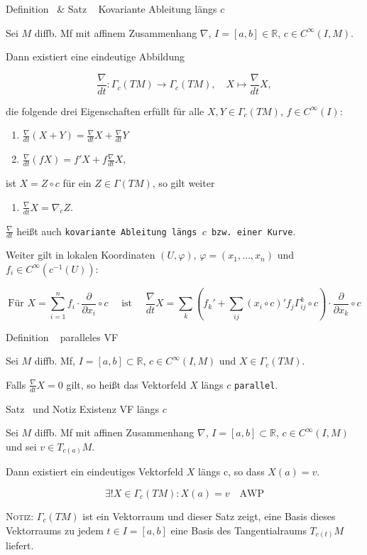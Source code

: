 \documentclass[a6paper,11pt,grid=front]{kartei}
\newcommand{\fl}[1]{\begin{flushleft}
 #1 \end{flushleft}}
\newcommand{\R}{\mathbb{R}}
\newcommand{\pd}[1][x_i]{\frac{\partial}{\partial {#1}}}
\newcommand{\nabladt}[1][t]{\frac{\nabla}{d#1}}
\newcounter{def}
\newcounter{satz}
\newcommand{\defreset}{\setcounter{def}{1}}
\newcommand{\satzreset}{\setcounter{satz}{1}}
\newcommand{\thisdef}{\thedef\ \stepcounter{def}}
\newcommand{\thissatz}{\thesatz\ \stepcounter{satz}}
\begin{document}
\nonameyet
{\scriptsize Definition \thisdef \& Satz \thissatz} 
{\scriptsize Kovariante Ableitung längs $c$}
{
	\scriptsize
	\vspace{-2em}
Sei $M$ diffb. Mf mit affinem Zusammenhang $\nabla$, $I =[a,b] \in \R$, 
$c\in C^\infty(I,M)$.
\fl{Dann existiert eine eindeutige Abbildung}
\[
\nabladt: \Gamma_c(TM) \to \Gamma_c(TM), \quad X \mapsto \nabladt X,
\]
\fl{die folgende drei Eigenschaften erfüllt für alle $X,Y \in \Gamma_c(TM)$,
$f\in C^\infty(I)$:}
\begin{enumerate}[1.]
\item $\nabladt(X+Y) = \nabladt X + \nabladt Y$
\item $\nabladt(fX) = f' X + f \nabladt X$,
\end{enumerate}
\fl{ist $X = Z \circ c$ für ein $Z \in \Gamma(TM)$, so gilt weiter}
\begin{enumerate}[3.]
\item $\nabladt X = \nabla_{\dot c} Z$.
\end{enumerate}
\fl{$\nabladt$ heißt auch \texttt{kovariante Ableitung längs $c$ bzw. einer
Kurve}.}
\fl{Weiter gilt in lokalen Koordinaten $(U,\varphi)$, 
\vspace{-1em}
$\varphi = (x_1,\dots,x_n)$ und $f_i \in C^\infty(c^{-1} (U))$:}
\[
\text{Für } X = \sum_{i=1}^n f_i \cdot \pd[x_i] \circ c 
\quad \text{ ist } \quad 
\nabladt X = \sum_k \left ( f_k' + \sum_{ij} (x_i \circ c)' f_j 
\Gamma^k_{ij} \circ c \right) \cdot \pd[x_k] \circ c
\]
}
{}
\defreset
\satzreset
{}

\nonameyet
{Definition \thisdef} {paralleles VF}
{
Sei $M$ diffb. Mf, $I = [a,b] \subset \R$, $c\in C^\infty(I,M)$ und 
$X \in \Gamma_c(TM)$.
\fl{Falls $\nabladt X = 0 $ gilt, so heißt das Vektorfeld $X$ längs $c$ 
\texttt{parallel}.}
}
{}

\nonameyet
{Satz \thissatz und Notiz} {Existenz VF längs $c$}
{
Sei $M$ diffb. Mf mit affinen Zusammenhang $\nabla$, 
$I = [a,b] \subset \R$, $c\in C^\infty(I,M)$ und sei $v \in T_{c(a)}M$.
\fl{Dann existiert ein eindeutiges Vektorfeld $X$ längs c,
so dass $X(a) = v$.}
\[
 \exists ! X \in \Gamma_c(TM): X(a) = v
 \quad \text{AWP}
\]
\fl{\textsc{Notiz:} $\Gamma_c(TM)$ ist ein Vektorraum und dieser Satz zeigt,
eine Basis dieses Vektorraums zu jedem $t\in I = [a,b]$ eine Basis
des Tangentialraums $T_{c(t)}M$ liefert.}
}
{}
\end{document}
